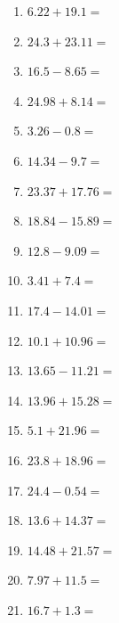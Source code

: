 \documentclass[12pt]{article}
\begin{document}
\begin{enumerate}
\item \large $ 6.22 + 19.1 = $ \vspace{1.5cm}
\item \large $ 24.3 + 23.11 = $ \vspace{1.5cm}
\item \large $ 16.5 - 8.65 = $ \vspace{1.5cm}
\item \large $ 24.98 + 8.14 = $ \vspace{1.5cm}
\item \large $ 3.26 - 0.8 = $ \vspace{1.5cm}
\newpage
\item \large $ 14.34 - 9.7 = $ \vspace{1.5cm}
\item \large $ 23.37 + 17.76 = $ \vspace{1.5cm}
\item \large $ 18.84 - 15.89 = $ \vspace{1.5cm}
\item \large $ 12.8 - 9.09 = $ \vspace{1.5cm}
\item \large $ 3.41 + 7.4 = $ \vspace{1.5cm}
\item \large $ 17.4 - 14.01 = $ \vspace{1.5cm}
\item \large $ 10.1 + 10.96 = $ \vspace{1.5cm}
\item \large $ 13.65 - 11.21 = $ \vspace{1.5cm}
\item \large $ 13.96 + 15.28 = $ \vspace{1.5cm}
\item \large $ 5.1 + 21.96 = $ \vspace{1.5cm}
\newpage
\item \large $ 23.8 + 18.96 = $ \vspace{1.5cm}
\item \large $ 24.4 - 0.54 = $ \vspace{1.5cm}
\item \large $ 13.6 + 14.37 = $ \vspace{1.5cm}
\item \large $ 14.48 + 21.57 = $ \vspace{1.5cm}
\item \large $ 7.97 + 11.5 = $ \vspace{1.5cm}
\item \large $ 16.7 + 1.3 = $ \vspace{1.5cm}

\end{enumerate}
\end{document}
